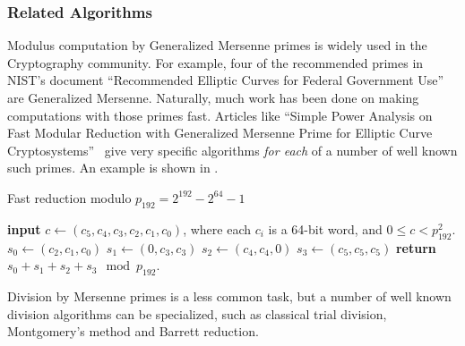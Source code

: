 \subsubsection{Related Algorithms}

Modulus computation by Generalized Mersenne primes is widely used in the Cryptography community.
For example, four of the recommended primes in NIST's document ``Recommended Elliptic Curves for Federal Government Use''~\cite{nist} are Generalized Mersenne.
Naturally, much work has been done on making computations with those primes fast.
Articles like ``Simple Power Analysis on Fast Modular Reduction with Generalized Mersenne Prime for Elliptic Curve Cryptosystems''~\cite{sakai2006simple}
give very specific algorithms \emph{for each} of a number of well known such primes.
An example is shown in .

\begin{algorithm}[H]
   \caption{Fast reduction modulo $p_{192} = 2^{192} - 2^{64} - 1$}
   \label{alg:solina}
   \begin{algorithmic}
      \State \textbf{input} $c \gets (c_5, c_4, c_3, c_2, c_1, c_0)$, where each $c_i$ is a 64-bit word, and $0 \le c < p^2_{192}$.
      \State $s_0 \gets (c_2, c_1, c_0)$
      \State $s_1 \gets (0, c_3, c_3)$
      \State $s_2 \gets (c_4, c_4, 0)$
      \State $s_3 \gets (c_5, c_5, c_5)$
      \State \textbf{return} $s_0 + s_1 + s_2 + s_3 \mod p_{192}$.
   \end{algorithmic}
\end{algorithm}

Division by Mersenne primes is a less common task, but a number of well known division algorithms can be specialized, such as 
 classical trial division, Montgomery's method and Barrett reduction.




